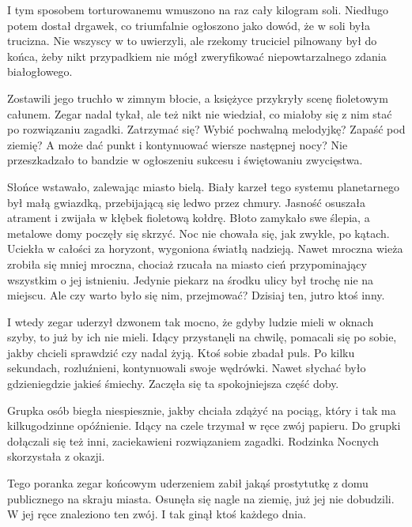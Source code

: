 I tym sposobem torturowanemu wmuszono na raz cały kilogram soli.
Niedługo potem dostał drgawek, co triumfalnie ogłoszono jako dowód, że w soli była trucizna.
Nie wszyscy w to uwierzyli, ale rzekomy truciciel pilnowany był do końca, żeby nikt przypadkiem nie mógł zweryfikować niepowtarzalnego zdania białogłowego.

Zostawili jego truchło w zimnym błocie, a księżyce przykryły scenę fioletowym całunem.
Zegar nadal tykał, ale też nikt nie wiedział, co miałoby się z nim stać po rozwiązaniu zagadki.
Zatrzymać się? Wybić pochwalną melodyjkę? Zapaść pod ziemię? A może dać punkt i kontynuować wiersze następnej nocy?
Nie przeszkadzało to bandzie w ogłoszeniu sukcesu i świętowaniu zwycięstwa.

Słońce wstawało, zalewając miasto bielą.
Biały karzeł tego systemu planetarnego był małą gwiazdką, przebijającą się ledwo przez chmury.
Jasność osuszała atrament i zwijała w kłębek fioletową kołdrę.
Błoto zamykało swe ślepia, a metalowe domy poczęły się skrzyć.
Noc nie chowała się, jak zwykle, po kątach. Uciekła w całości za horyzont, wygoniona światłą nadzieją.
Nawet mroczna wieża zrobiła się mniej mroczna, chociaż rzucała na miasto cień przypominający wszystkim o jej istnieniu.
Jedynie piekarz na środku ulicy był trochę nie na miejscu.
Ale czy warto było się nim, przejmować? 
Dzisiaj ten, jutro ktoś inny.

I wtedy zegar uderzył dzwonem tak mocno, że gdyby ludzie mieli w oknach szyby, to już by ich nie mieli.
Idący przystanęli na chwilę, pomacali się po sobie, jakby chcieli sprawdzić czy nadal żyją.
Ktoś sobie zbadał puls.
Po kilku sekundach, rozluźnieni, kontynuowali swoje wędrówki.
Nawet słychać było gdzieniegdzie jakieś śmiechy.
Zaczęła się ta spokojniejsza część doby.

Grupka osób biegła niespiesznie, jakby chciała zdążyć na pociąg, który i tak ma kilkugodzinne opóźnienie.
Idący na czele trzymał w ręce zwój papieru.
Do grupki dołączali się też inni, zaciekawieni rozwiązaniem zagadki.
Rodzinka Nocnych skorzystała z okazji.

Tego poranka zegar końcowym uderzeniem zabił jakąś prostytutkę z domu publicznego na skraju miasta.
Osunęła się nagle na ziemię, już jej nie dobudzili. W jej ręce znaleziono ten zwój.
I tak ginął ktoś każdego dnia.

